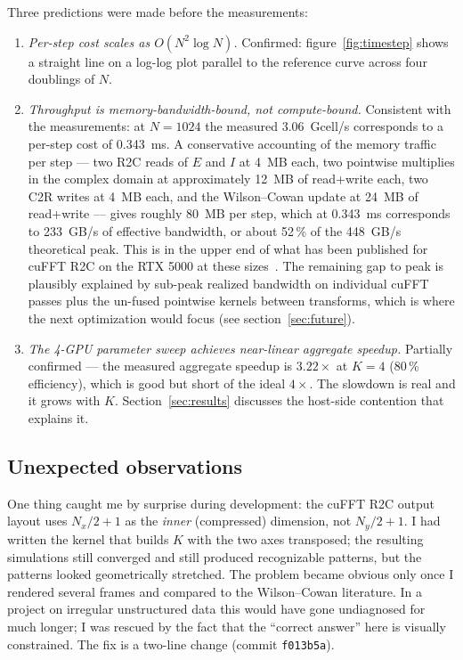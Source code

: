 \documentclass[11pt]{article}
\begin{document}
Three predictions were made before the measurements:
\begin{enumerate}
  \item \emph{Per-step cost scales as $O(N^{2} \log N)$.}
  Confirmed: figure~\ref{fig:timestep} shows a straight line on a
  log-log plot parallel to the reference curve across four doublings
  of $N$.
  \item \emph{Throughput is memory-bandwidth-bound, not compute-bound.}
  Consistent with the measurements: at $N = 1024$ the measured
  \SI{3.06}{Gcell/s} corresponds to a per-step cost of
  \SI{0.343}{\milli\second}. A conservative accounting of the memory
  traffic per step --- two R2C reads of $E$ and $I$ at \SI{4}{MB}
  each, two pointwise multiplies in the complex domain at
  approximately \SI{12}{MB} of read+write each, two C2R writes at
  \SI{4}{MB} each, and the Wilson--Cowan update at \SI{24}{MB} of
  read+write --- gives roughly \SI{80}{MB} per step, which at
  \SI{0.343}{\milli\second} corresponds to \SI{233}{GB/s} of effective
  bandwidth, or about 52\,\% of the \SI{448}{GB/s} theoretical peak.
  This is in the upper end of what has been published for cuFFT R2C
  on the RTX 5000 at these sizes~\cite{cufft}. The remaining gap to
  peak is plausibly explained by sub-peak realized bandwidth on
  individual cuFFT passes plus the un-fused pointwise kernels between
  transforms, which is where the next optimization would
  focus (see section~\ref{sec:future}).
  \item \emph{The 4-GPU parameter sweep achieves near-linear aggregate
  speedup.} Partially confirmed --- the measured aggregate speedup is
  $3.22\times$ at $K = 4$ (80\,\% efficiency), which is good but
  short of the ideal $4\times$. The slowdown is real and it grows
  with $K$. Section~\ref{sec:results} discusses the host-side
  contention that explains it.
\end{enumerate}

\subsection{Unexpected observations}

One thing caught me by surprise during development: the cuFFT R2C
output layout uses $N_{x}/2+1$ as the \emph{inner} (compressed)
dimension, not $N_{y}/2+1$. I had written the kernel that
builds $\widehat{K}$ with the two axes transposed; the resulting
simulations still converged and still produced recognizable patterns,
but the patterns looked geometrically stretched. The problem became
obvious only once I rendered several frames and compared to the
Wilson--Cowan literature. In a project on irregular unstructured data
this would have gone undiagnosed for much longer; I was rescued by
the fact that the ``correct answer'' here is visually constrained.
The fix is a two-line change (commit \texttt{f013b5a}).
\end{document}
